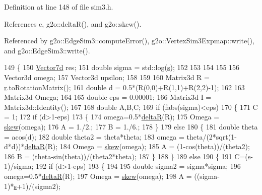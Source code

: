 Definition at line 148 of file sim3.\+h.



References c, g2o\+::delta\+R(), and g2o\+::skew().



Referenced by g2o\+::\+Edge\+Sim3\+::compute\+Error(), g2o\+::\+Vertex\+Sim3\+Expmap\+::write(), and g2o\+::\+Edge\+Sim3\+::write().


\begin{DoxyCode}
149     \{
150       \hyperlink{namespaceg2o_a4740ec41130f2ecc628c81f71261c8de}{Vector7d} res;
151       \textcolor{keywordtype}{double} sigma = std::log(\hyperlink{structg2o_1_1Sim3_a2cad7c49340494d4bdd28a497e4cb486}{s});
152 
153       
154 
155    
156       Vector3d omega;
157       Vector3d upsilon;
158 
159 
160       Matrix3d R = \hyperlink{structg2o_1_1Sim3_a55dbe5c6ffe22526f20e05f0c23aa832}{r}.toRotationMatrix();
161       \textcolor{keywordtype}{double} d =  0.5*(R(0,0)+R(1,1)+R(2,2)-1);
162 
163       Matrix3d Omega;
164 
165       \textcolor{keywordtype}{double} eps = 0.00001;
166       Matrix3d I = Matrix3d::Identity();
167 
168       \textcolor{keywordtype}{double} A,B,C;
169       \textcolor{keywordflow}{if} (fabs(sigma)<eps)
170       \{
171         C = 1;
172         \textcolor{keywordflow}{if} (d>1-eps)
173         \{
174           omega=0.5*\hyperlink{namespaceg2o_a2e39915fb420fd7dc2d3802435e4a6a9}{deltaR}(R);
175           Omega = \hyperlink{namespaceg2o_adb3143a37b9bc002f4f7b6423061ef81}{skew}(omega);
176           A = 1./2.;
177           B = 1./6.;
178         \}
179         \textcolor{keywordflow}{else}
180         \{
181           \textcolor{keywordtype}{double} theta = acos(d);
182           \textcolor{keywordtype}{double} theta2 = theta*theta;
183           omega = theta/(2*sqrt(1-d*d))*\hyperlink{namespaceg2o_a2e39915fb420fd7dc2d3802435e4a6a9}{deltaR}(R);
184           Omega = \hyperlink{namespaceg2o_adb3143a37b9bc002f4f7b6423061ef81}{skew}(omega);
185           A = (1-cos(theta))/(theta2);
186           B = (theta-sin(theta))/(theta2*theta);
187         \}
188       \}
189       \textcolor{keywordflow}{else}
190       \{
191         C=(\hyperlink{structg2o_1_1Sim3_a2cad7c49340494d4bdd28a497e4cb486}{s}-1)/sigma;
192         \textcolor{keywordflow}{if} (d>1-eps)
193         \{
194 
195           \textcolor{keywordtype}{double} sigma2 = sigma*sigma;
196           omega=0.5*\hyperlink{namespaceg2o_a2e39915fb420fd7dc2d3802435e4a6a9}{deltaR}(R);
197           Omega = \hyperlink{namespaceg2o_adb3143a37b9bc002f4f7b6423061ef81}{skew}(omega);
198           A = ((sigma-1)*\hyperlink{structg2o_1_1Sim3_a2cad7c49340494d4bdd28a497e4cb486}{s}+1)/(sigma2);

\end{DoxyCode}
